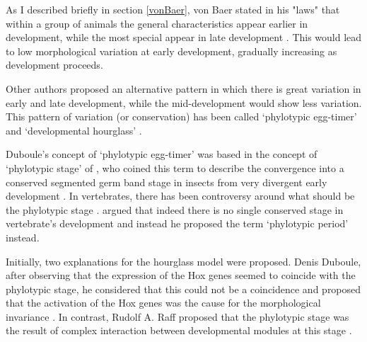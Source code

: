 
%
%
%

As I described briefly in section \ref{vonBaer}, von Baer stated in his "laws" that within a group of animals the general characteristics appear earlier in development, while the most special appear in late development \citep{vonBaer1828uber}.
This would lead to low morphological variation at early development, gradually increasing as development proceeds.

Other authors \citep{Medawar1954,Slack1993,Duboule1994,Raff1996} proposed an alternative pattern in which there is great variation in early and late development, while the mid-development would show less variation.
This pattern of variation (or conservation) has been called `phylotypic egg-timer' \citep{Duboule1994} and `developmental hourglass' \citep{Raff1996}.

Duboule's concept of `phylotypic egg-timer' was based in the concept of `phylotypic stage' of \citet{Sander1983}, who coined this term to describe the convergence into a conserved segmented germ band stage in insects from very divergent early development \citep{Sander1996}.
In vertebrates, there has been controversy around what should be the phylotypic stage \citep{Ballard1981,Slack1993,Duboule1994}. \citet{Richardson1995} argued that indeed there is no single conserved stage in vertebrate's development and instead he proposed the term `phylotypic period' instead.

Initially, two explanations for the hourglass model were proposed.
Denis Duboule, after observing that the expression of the Hox genes seemed to coincide with the phylotypic stage, he considered that this could not be a coincidence and proposed that the activation of the Hox genes was the cause for the morphological invariance \citep{Duboule1994}.
In contrast, Rudolf A. Raff proposed that the phylotypic stage was the result of complex interaction between developmental modules at this stage  \citep{Raff1996}.

